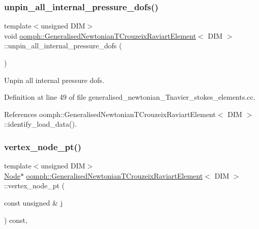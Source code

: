 \subsubsection{\texorpdfstring{unpin\+\_\+all\+\_\+internal\+\_\+pressure\+\_\+dofs()}{unpin\_all\_internal\_pressure\_dofs()}}
{\footnotesize\ttfamily template$<$unsigned D\+IM$>$ \\
void \hyperlink{classoomph_1_1GeneralisedNewtonianTCrouzeixRaviartElement}{oomph\+::\+Generalised\+Newtonian\+T\+Crouzeix\+Raviart\+Element}$<$ D\+IM $>$\+::unpin\+\_\+all\+\_\+internal\+\_\+pressure\+\_\+dofs (\begin{DoxyParamCaption}{ }\end{DoxyParamCaption})}



Unpin all internal pressure dofs. 



Definition at line 49 of file generalised\+\_\+newtonian\+\_\+\+Tnavier\+\_\+stokes\+\_\+elements.\+cc.



References oomph\+::\+Generalised\+Newtonian\+T\+Crouzeix\+Raviart\+Element$<$ D\+I\+M $>$\+::identify\+\_\+load\+\_\+data().

\mbox{\label{classoomph_1_1GeneralisedNewtonianTCrouzeixRaviartElement_a5f782473353e5e90ca5bc0edf0f82610}} 
\subsubsection{\texorpdfstring{vertex\+\_\+node\+\_\+pt()}{vertex\_node\_pt()}}
{\footnotesize\ttfamily template$<$unsigned D\+IM$>$ \\
\hyperlink{classoomph_1_1Node}{Node}$\ast$ \hyperlink{classoomph_1_1GeneralisedNewtonianTCrouzeixRaviartElement}{oomph\+::\+Generalised\+Newtonian\+T\+Crouzeix\+Raviart\+Element}$<$ D\+IM $>$\+::vertex\+\_\+node\+\_\+pt (\begin{DoxyParamCaption}\item[{const unsigned \&}]{j }\end{DoxyParamCaption}) const\hspace{0.3cm}{\ttfamily [inline]}, {\ttfamily [virtual]}}



